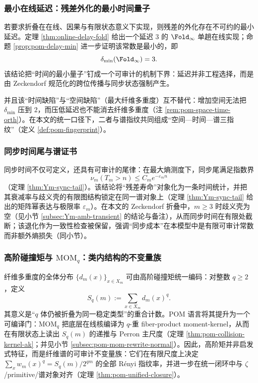 \subsubsection{最小在线延迟：残差外化的最小时间量子}\label{subsubsec:frt-min-online-delay}
若要求折叠在在线、因果与有限状态意义下实现，则残差的外化存在不可约的最小延迟。定理 \ref{thm:online-delay-fold} 给出一个延迟 \(3\) 的 \(\Fold_\infty\) 单趟在线实现；命题 \ref{prop:pom-delay-min} 进一步证明该常数是最小的，即
\[
\delta_{\min}(\Fold_\infty)=3.
\]
该结论把“时间的最小量子”钉成一个可审计的机制下界：延迟并非工程选择，而是由 Zeckendorf 规范化的跨位传播与同步状态强制产生。\par
并且该“时间缺陷”与“空间缺陷”（最大纤维多重度）互不替代：增加空间无法把 \(\delta_{\min}\) 压到 \(2\)，而压低延迟也不能消去纤维多重度（注 \ref{rem:pom-space-time-orth}）。在本文的统一口径下，二者与谱指纹共同组成“空间—时间—谱三指纹”（定义 \ref{def:pom-fingerprint}）。


\subsubsection{同步时间尾与谱证书}\label{subsubsec:frt-sync-tail-spectrum}
同步时间不仅可定义，还具有可审计的尾律：在最大熵测度下，同步尾满足指数界
\[
\nu_m(T_m>n)\le C_m e^{-\varepsilon_m n}
\]
（定理 \ref{thm:Ym-sync-tail}）。该结论将“残差寿命”对象化为一条时间统计，并把其衰减率与歧义壳的有限图结构锁定在同一谱对象上（定理 \ref{thm:Ym-sync-tail} 给出的矩阵幂表达与极限率 \(\varepsilon_m\)）。在本文的 Zeckendorf 折叠中，\(m\ge 3\) 时歧义壳为空（见小节 \ref{subsec:Ym-amb-transient} 的结论与备注），从而同步时间在有限处截断；该退化作为一致性检查被保留，强调“同步成本”在本模型中是有限可审计常数而非额外熵损失（同小节）。

\subsubsection{高阶碰撞矩与 \texorpdfstring{$\mathrm{MOM}_q$}{MOMq}：类内结构的不变量族}\label{subsubsec:frt-moments}
纤维多重度的全体分布 \(\{d_m(x)\}_{x\in X_m}\) 可由高阶碰撞矩统一编码：对整数 \(q\ge 2\)，定义
\[
S_q(m):=\sum_{x\in X_m}d_m(x)^q.
\]
其意义是“\(q\) 体仍被折叠为同一稳定类型”的重合计数。POM 语言将其提升为一个可编译门：\(\mathrm{MOM}_q\) 把底层在线核编译为 \(q\)-重 fiber-product moment-kernel，从而在有限状态上读出 \(S_q(m)\) 的递推与 Perron 主尺度（定理 \ref{thm:pom-collision-kernel-ak}；并见小节 \ref{subsec:pom-mom-rewrite-normal}）。因此，高阶矩并非启发式特征，而是纤维谱的可审计不变量族：它们在有限尺度上决定 \(\sum_x w_m(x)^q=S_q(m)/2^{qm}\) 的全部 Rényi 指纹率，并进一步在统一闭环中与 \(\zeta\)/primitive/谱对象对齐（定理 \ref{thm:pom-unified-closure}）。

